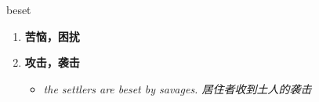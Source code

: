 
\begin{frame}
{\huge beset}
\begin{center}
\begin{enumerate}\Large
  \item \textbf{苦恼，困扰}
  \item \textbf{攻击，袭击}
  \begin{itemize}
    \item \em{\Large{the settlers are beset by savages. 居住者收到土人的袭击}}
  \end{itemize}
\end{enumerate}
\end{center}
\end{frame}
